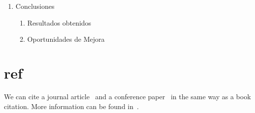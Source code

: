 {\begin{enumerate}
\begin{enumerate}
\begin{enumerate}
      \item Performance del arreglo RAID
      \item Estabilidad del prototipo
      \item Condiciones t\'{e}rmicas de operaci\'{o}n
    \end{enumerate}
    \item Compatibilidad multiplataforma
    \begin{enumerate}
      \item GNU/Linux
      \item Mac OS X
      \item Apple iOS
      \item Android
      \item Windows
    \end{enumerate}
  \end{enumerate}
  \item Conclusiones
  \begin{enumerate}
    \item Resultados obtenidos
    \item Oportunidades de Mejora
  \end{enumerate}
\end{enumerate}
}

\section{ref}
We can cite a journal article~\cite{someguy2002} and a conference
paper~\cite{LastName1996} in the same way as a book citation.  More
information can be found in~\cite{lam1994}.